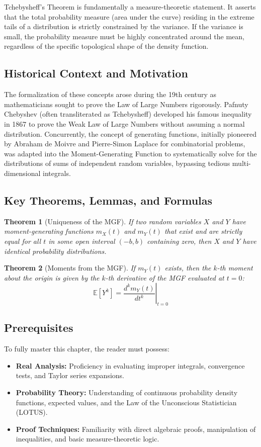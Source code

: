 \documentclass[11pt, a4paper]{article}
\newtheorem{theorem}{Theorem}[section]
\theoremstyle{definition}
\theoremstyle{remark}
\newcommand{\E}{\mathbb{E}}
\begin{document}
Tchebysheff's Theorem is fundamentally a measure-theoretic statement. It asserts that the total probability measure (area under the curve) residing in the extreme tails of a distribution is strictly constrained by the variance. If the variance is small, the probability measure must be highly concentrated around the mean, regardless of the specific topological shape of the density function.

\subsection{Historical Context and Motivation}
The formalization of these concepts arose during the 19th century as mathematicians sought to prove the Law of Large Numbers rigorously. Pafnuty Chebyshev (often transliterated as Tchebysheff) developed his famous inequality in 1867 to prove the Weak Law of Large Numbers without assuming a normal distribution. Concurrently, the concept of generating functions, initially pioneered by Abraham de Moivre and Pierre-Simon Laplace for combinatorial problems, was adapted into the Moment-Generating Function to systematically solve for the distributions of sums of independent random variables, bypassing tedious multi-dimensional integrals.

\subsection{Key Theorems, Lemmas, and Formulas}
\begin{theorem}[Uniqueness of the MGF]
If two random variables $X$ and $Y$ have moment-generating functions $m_X(t)$ and $m_Y(t)$ that exist and are strictly equal for all $t$ in some open interval $(-b, b)$ containing zero, then $X$ and $Y$ have identical probability distributions.
\end{theorem}

\begin{theorem}[Moments from the MGF]
If $m_Y(t)$ exists, then the $k$-th moment about the origin is given by the $k$-th derivative of the MGF evaluated at $t=0$:
\[ \E[Y^k] = \left. \frac{d^k m_Y(t)}{dt^k} \right|_{t=0} \]
\end{theorem}

\subsection{Prerequisites}
To fully master this chapter, the reader must possess:
\begin{itemize}
    \item \textbf{Real Analysis:} Proficiency in evaluating improper integrals, convergence tests, and Taylor series expansions.
    \item \textbf{Probability Theory:} Understanding of continuous probability density functions, expected values, and the Law of the Unconscious Statistician (LOTUS).
    \item \textbf{Proof Techniques:} Familiarity with direct algebraic proofs, manipulation of inequalities, and basic measure-theoretic logic.
\end{itemize}
\end{document}
